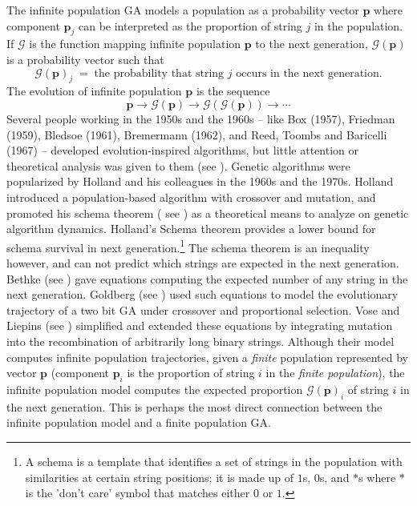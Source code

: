 The infinite population GA models a population as a probability vector $\bm{p}$ where component $\bm{p}_j$ 
can be interpreted as the proportion of string $j$ in the population. If $\mathcal{G}$ is the function mapping infinite population $\bm{p}$ to 
the next generation, $\mathcal{G}(\bm{p})$ is a probability vector such that 
\[
\mathcal{G}(\bm{p})_j \; = \; \text{the probability that string $j$ occurs in the next generation}.
\]
The evolution of infinite population $\bm{p}$ is the sequence
\[ \bm{p} \to \mathcal{G}(\bm{p}) \to  {\mathcal{G}}(\mathcal{G}(\bm{p})) \to \cdots \]
\setcounter{footnote}{2}
Several people working in the 1950s and the 1960s -- like Box (1957), Friedman (1959),
Bledsoe (1961), Bremermann (1962), and Reed, Toombs and Baricelli (1967) -- developed evolution-inspired algorithms, 
but little attention or theoretical analysis was given to them (see \cite{Mitchell1999}). Genetic algorithms were popularized by Holland 
and his colleagues in the 1960s and the 1970s. Holland introduced a population-based algorithm with crossover and mutation, 
and promoted his schema theorem ( see \cite{Holland1975}) as a theoretical means to analyze on genetic algorithm dynamics. 
Holland's Schema theorem provides a lower bound for schema survival in 
next generation.\footnote{A schema is a template that identifies a set of strings in the population with similarities 
at certain string positions; it is made up of $1$s, $0$s, and $\ast$s where 
$\ast$ is the 'don't care' symbol that matches either $0$ or $1$.} The schema theorem is an inequality however, 
and can not predict which strings are expected in the next generation. 
Bethke (see \cite{Bethke1981}) gave equations computing the expected number of any string in the next generation. 
Goldberg (see \cite{Goldberg1987}) used such equations 
to model the evolutionary trajectory of a two bit GA under crossover 
and proportional selection. Vose and Liepins (see \cite{VoseLiepins1991}) simplified and extended 
these equations by integrating mutation into the recombination of arbitrarily long binary strings. 
Although their model computes infinite population trajectories, given a {\em finite} population represented by vector $\bm{p}$  
(component $\bm{p}_i$ is the proportion of string $i$ in the {\em finite population}), the infinite population model 
computes the expected proportion $\mathcal{G}(\bm{p})_i$ of string $i$ in the next generation.  This is perhaps the most 
direct connection between the infinite population model and a finite population GA.


